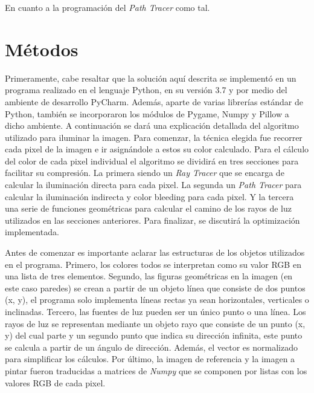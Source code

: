 \documentclass[conference]{IEEEtran}
\begin{document}
En cuanto a la programación del \textit{Path Tracer} como tal.
\section{Métodos}
Primeramente, cabe resaltar que la solución aquí descrita se implementó en un programa realizado en el lenguaje Python, en su versión 3.7 y por medio del ambiente de desarrollo PyCharm. Además, aparte de varias librerías estándar de Python, también se incorporaron los módulos de Pygame, Numpy y Pillow a dicho ambiente. A continuación se dará una explicación detallada del algoritmo utilizado para iluminar la imagen. Para comenzar, la técnica elegida fue recorrer cada pixel de la imagen e ir asignándole a estos su color calculado. Para el cálculo del color de cada pixel individual el algoritmo se dividirá en tres secciones para facilitar su compresión. La primera siendo un \textit{Ray Tracer} que se encarga de calcular la iluminación directa para cada pixel. La segunda un \textit{Path Tracer} para calcular la iluminación indirecta y color bleeding para cada pixel. Y la tercera una serie de funciones geométricas para calcular el camino de los rayos de luz utilizados en las secciones anteriores. Para finalizar, se discutirá la optimización implementada. 

Antes de comenzar es importante aclarar las estructuras de los objetos utilizados en el programa. Primero, los colores todos se interpretan como su valor RGB en una lista de tres elementos. Segundo, las figuras geométricas en la imagen (en este caso paredes) se crean a partir de un objeto línea que consiste de dos puntos (x, y), el programa solo implementa líneas rectas ya sean horizontales, verticales o inclinadas. Tercero, las fuentes de luz pueden ser un único punto o una línea. Los rayos de luz se representan mediante un objeto rayo que consiste de un punto (x, y) del cual parte y un segundo punto que indica su dirección infinita, este punto se calcula a partir de un ángulo de dirección. Además, el vector es normalizado para simplificar los cálculos. Por último, la imagen de referencia y la imagen a pintar fueron traducidas a matrices de \textit{Numpy} que se componen por listas con los valores RGB de cada pixel. 
\end{document}
